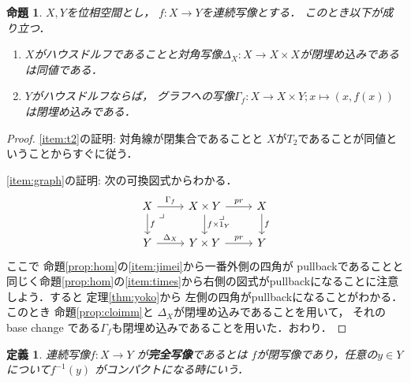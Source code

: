 \documentclass[leqno, a4paper, 12pt, dvipdfmx]{jsarticle}
\newtheorem{prop}[thm]{命題}
\newtheorem{df}[thm]{定義}
\begin{document}
\begin{prop}\label{prop:immgraph}
$X, Y$を位相空間とし，
$f\colon X\to Y$を連続写像とする．
このとき以下が成り立つ．
\begin{enumerate}[label=\textup{(T\arabic*)}]
\item\label{item:t2}
$X$がハウスドルフであることと対角写像$\Delta_{X}\colon X\to X\times X$が閉埋め込みであるは同値である．

\item\label{item:graph}
$Y$がハウスドルフならば，
グラフへの写像$\Gamma_{f}\colon X\to X\times Y; x\mapsto (x, f(x))$は閉埋め込みである．
\end{enumerate}
\end{prop}
\begin{proof}
\ref{item:t2}の証明: 対角線が閉集合であることと
$X$が$T_{2}$であることが同値ということからすぐに従う．

\ref{item:graph}の証明:
次の可換図式からわかる．
\[
\begin{tikzcd}
X \arrow[r, "\Gamma_{f}"] \arrow[d, "f"] \arrow[dr, phantom, "\lrcorner", very near start]
& X\times Y \arrow[d,"f\times 1_{Y}"]  \arrow[r, "pr"]\arrow[dr, phantom, "\lrcorner", very near start] & X \arrow[d, "f"]\\
Y \arrow[r,"\Delta_{X}"] & Y\times Y \arrow[r, "pr"]& Y
\end{tikzcd}
\]
ここで
命題\ref{prop:hom}の\ref{item:jimei}から一番外側の四角が
pullbackであることと
同じく命題\ref{prop:hom}の\ref{item:times}から右側の図式がpullbackになることに注意しよう．すると
定理\ref{thm:yoko}から
左側の四角がpullbackになることがわかる．
このとき
命題\ref{prop:cloimm}と
$\Delta_{X}$が閉埋め込みであることを用いて，
それの
base change である$\Gamma_{f}$も閉埋め込みであることを用いた．おわり．
\end{proof}


\begin{df}
連続写像$f\colon X\to Y$
が\textbf{完全写像}であるとは
$f$が閉写像であり，任意の$y\in Y$
について$f^{-1}(y)$
がコンパクトになる時にいう．
\end{df}
\end{document}
